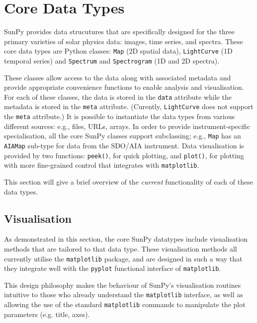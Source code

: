 \section{Core Data Types}\label{sec:DataTypes}

SunPy provides data strucutures that are specifically designed for the
three primary varieties of solar physics data: images, time series, and
spectra. These core data types are Python classes:
\texttt{Map} (2D spatial data), \texttt{LightCurve} (1D temporal series)
and \texttt{Spectrum} and \texttt{Spectrogram} (1D and 2D spectra). 

These classes allow access to the data
along with associated metadata and provide appropriate convenience functions to
enable analysis and visualisation. For each of these classes, the data is
stored in the \texttt{data} attribute while the metadata is stored 
in the \texttt{meta} attribute. (Curently, \texttt{LightCurve} does 
not support the \texttt{meta} attribute.) 
It is possible to instantiate the
data types from various
different sources: e.g., files, URLs, arrays.  
In order to provide instrument-specific specialisation, all the core SunPy classes 
support subclassing; e.g., \texttt{Map} has an \texttt{AIAMap} 
sub-type for data from the SDO/AIA instrument. 
Data visualisation is provided by two functions: \texttt{peek()}, for quick 
plotting, and \texttt{plot()}, for plotting with more fine-grained control that 
integrates with \texttt{matplotlib}.

This section will give a brief overview of the \textit{current} functionality 
of each of these data types.





\subsection{Visualisation}
\label{subsec:Viz}
As demonstrated in this section, the core SunPy datatypes 
include visualisation methods that are tailored to that data type. 
These visualisation methods all currently utilise the \texttt{matplotlib} 
package, and are designed in such a way that they integrate well with 
the \texttt{pyplot} functional interface of \texttt{matplotlib}.

This design philosophy makes the behaviour of SunPy's visualisation 
routines intuitive to those who already understand the \texttt{matplotlib}
interface, as well as allowing the use of the standard 
\texttt{matplotlib} commands to manipulate the plot parameters (e.g. title, axes).